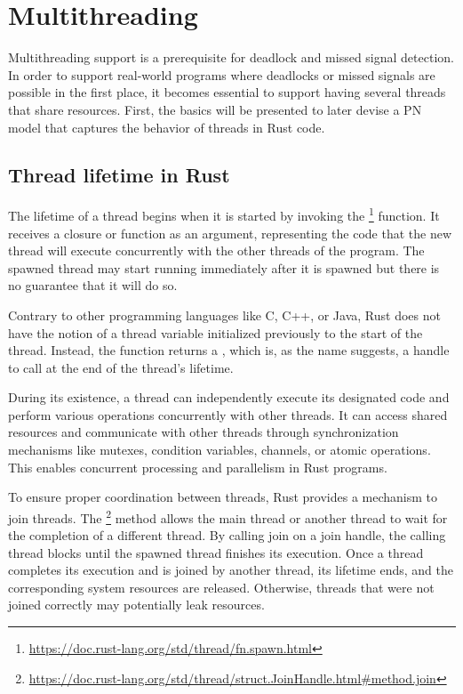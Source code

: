 \section{Multithreading}

Multithreading support is a prerequisite for deadlock and missed signal detection.
In order to support real-world programs
where deadlocks or missed signals are possible in the first place,
it becomes essential to support having several threads that share resources.
First, the basics will be presented to later devise a \acrshort{PN} model that captures
the behavior of threads in Rust code.

\subsection{Thread lifetime in Rust}

The lifetime of a thread begins when it is started by invoking the
\footnote{\url{https://doc.rust-lang.org/std/thread/fn.spawn.html}}
function.
It receives a closure or function as an argument,
representing the code that the new thread will execute concurrently
with the other threads of the program.
The spawned thread may start running immediately after it is spawned
but there is no guarantee that it will do so.

Contrary to other programming languages like C, C++, or Java,
Rust does not have the notion of a thread variable
initialized previously to the start of the thread.
Instead, the function  returns
a ,
which is, as the name suggests, a handle to call 
at the end of the thread's lifetime.

During its existence, a thread can independently execute its designated code
and perform various operations concurrently with other threads.
It can access shared resources and communicate with other threads
through synchronization mechanisms like
mutexes, condition variables, channels, or atomic operations.
This enables concurrent processing and parallelism in Rust programs.

To ensure proper coordination between threads,
Rust provides a mechanism to join threads.
The \footnote{\url{https://doc.rust-lang.org/std/thread/struct.JoinHandle.html\#method.join}} method
allows the main thread or another thread
to wait for the completion of a different thread.
By calling join on a join handle,
the calling thread blocks until the spawned thread finishes its execution.
Once a thread completes its execution and is joined by another thread,
its lifetime ends, and the corresponding system resources are released.
Otherwise, threads that were not joined correctly may potentially leak resources.

